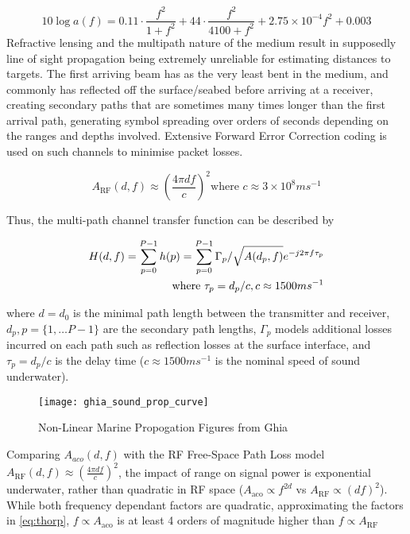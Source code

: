  \begin{equation}
 \label{eq:thorp}
 10 \log a(f) = 0.11 \cdot \frac{f^2}{1+f^2} + 44\cdot\frac{f^2}{4100+f^2}+ 2.75\times10^{-4} f^2 + 0.003
 \end{equation}
 Refractive lensing and the multipath nature of the medium result in supposedly line of sight propagation being extremely unreliable for estimating distances to targets.
 The first arriving beam has as the very least bent in the medium, and commonly has reflected off the surface/seabed before arriving at a receiver, creating secondary paths that are sometimes many times longer than the first arrival path, generating symbol spreading over orders of seconds depending on the ranges and depths involved.
 Extensive Forward Error Correction coding is used on such channels to minimise packet losses.
 
 \begin{equation}
 \label{eq:fspl}
 A_{\text{RF}}(d,f) \approx \left( \frac{4\pi d f}{c} \right)^2
 \text{where }c\approx 3\times10^8ms^{-1}
 \end{equation}
 
 Thus, the multi-path channel transfer function can be described by 
 
 \begin{align}
 \label{eq:acomultipath}
 H(d,f) =\sum_{p=0}^{P-1} h(p) = \sum_{p=0}^{P-1} \Gamma_p / \sqrt{A(d_p,f)}e^{-j 2 \pi f \tau_p} \\
 \text{where } \tau_p = d_p/c, c \approx 1500 ms^{-1} \notag
 \end{align}
 
 where $d=d_0$ is the minimal path length between the transmitter and receiver, $d_p,p=\{1,\dots P-1\}$ are the secondary path lengths, $\Gamma_p$ models additional losses incurred on each path such as reflection losses at the surface interface, and $\tau_p = d_p/c$ is the delay time ($c \approx 1500 ms^{-1}$ is the nominal speed of sound underwater).
 
\begin{figure}
  \texttt{[image: ghia\_sound\_prop\_curve]}
  \caption{Non-Linear Marine Propogation Figures from Ghia}
  \label{fig:ghia_sound_prop_curve}
\end{figure}
 
 Comparing $A_{aco}(d,f)$ with the RF Free-Space Path Loss model $A_{\text{RF}}(d,f) \approx \left( \frac{4\pi d f}{c} \right)^2$, the impact of range on signal power is exponential underwater, rather than quadratic in RF space ($A_{\text{aco}} \propto f^{2d}$ vs $A_{\text{RF}} \propto (df)^2$).
 While both frequency dependant factors are quadratic, approximating the factors in \eqref{eq:thorp}, $f\propto A_{\text{aco}}$ is at least 4 orders of magnitude higher than $f\propto A_{\text{RF}}$
 

